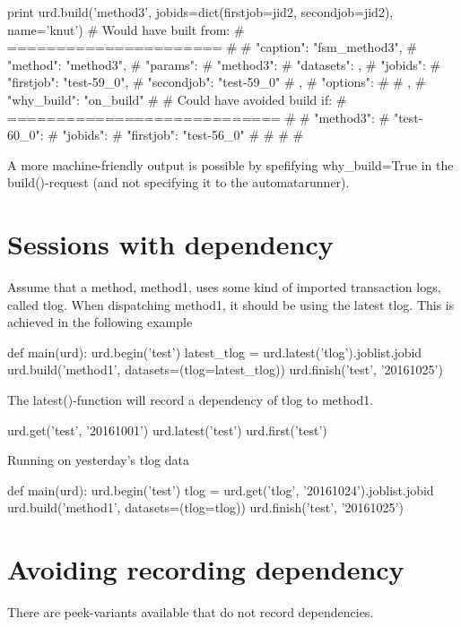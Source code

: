 \begin{python}
  print urd.build('method3', jobids=dict(firstjob=jid2, secondjob=jid2), name='knut')
# Would have built from:
# ======================
# {
#     "caption": "fsm_method3", 
#     "method": "method3", 
#     "params": {
#         "method3": {
#             "datasets": {}, 
#             "jobids": {
#                 "firstjob": "test-59_0", 
#                 "secondjob": "test-59_0"
#             }, 
#             "options": {}
#         }
#     }, 
#     "why_build": "on_build"
# }
# Could have avoided build if:
# ============================
# {
#     "method3": {
#         "test-60_0": {
#             "jobids": {
#                 "firstjob": "test-56_0"
#             }
#         }
#     }
# }
\end{python}
A more machine-friendly output is possible by spefifying
why\_build=True in the build()-request (and not specifying it to the
automatarunner).



\section{Sessions with dependency}

Assume that a method, method1, uses some kind of imported transaction
logs, called tlog.  When dispatching method1, it should be using the
latest tlog.  This is achieved in the following example

\begin{python}
def main(urd):
  urd.begin('test')
  latest_tlog = urd.latest('tlog').joblist.jobid
  urd.build('method1', datasets=(tlog=latest_tlog))
  urd.finish('test', '20161025')
\end{python}
The latest()-function will record a dependency of tlog to method1.

\begin{python}
  urd.get('test', '20161001')
  urd.latest('test')
  urd.first('test')
\end{python}

Running on yesterday's tlog data

\begin{python}
def main(urd):
  urd.begin('test')
  tlog = urd.get('tlog', '20161024').joblist.jobid
  urd.build('method1', datasets=(tlog=tlog))
  urd.finish('test', '20161025')
\end{python}



\section{Avoiding recording dependency}
There are peek-variants available that do not record dependencies.

